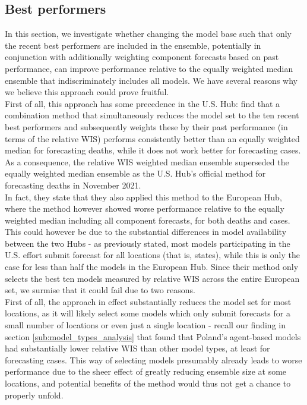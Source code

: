 \newpage
\subsection{Best performers}
In this section, we investigate whether changing the model base such that only the recent best performers are included in the ensemble, potentially in conjunction with additionally weighting component forecasts based on past performance, can improve performance relative to the equally weighted median ensemble that indiscriminately includes all models. We have several reasons why we believe this approach could prove fruitful. \medskip\\
First of all, this approach has some precedence in the U.S. Hub: \cite{ray_comparing_2022} find that a combination method that simultaneously reduces the model set to the ten recent best performers and subsequently weights these by their past performance (in terms of the relative WIS) performs consistently better than an equally weighted median for forecasting deaths, while it does not work better for forecasting cases. As a consequence, the relative WIS weighted median ensemble superseded the equally weighted median ensemble as the U.S. Hub's official method for forecasting deaths in November 2021.\\ 
In fact, they state that they also applied this method to the European Hub, where the method however showed worse performance relative to the equally weighted median including all component forecasts, for both deaths and cases. This could however be due to the substantial differences in model availability between the two Hubs - as previously stated, most models participating in the U.S. effort submit forecast for all locations (that is, states), while this is only the case for less than half the models in the European Hub. Since their method only selects the best ten models measured by relative WIS across the entire European set, we surmise that it could fail due to two reasons.\\
First of all, the approach in effect substantially reduces the model set for most locations, as it will likely select some models which only submit forecasts for a small number of locations or even just a single location - recall our finding in section \ref{sub:model_types_analysis} that found that Poland's agent-based models had substantially lower relative WIS than other model types, at least for forecasting cases. This way of selecting models presumably already leads to worse performance due to the sheer effect of greatly reducing ensemble size at some locations, and potential benefits of the method would thus not get a chance to properly unfold.\\
